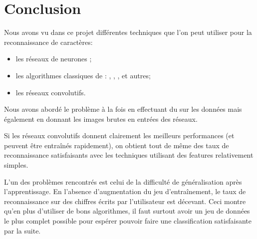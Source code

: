 
\chapter{Conclusion}

Nous avons vu dans ce projet différentes techniques que l'on peut utiliser 
pour la reconnaissance de caractères:
\begin{itemize}
  \item les réseaux de neurones ;
  \item les algorithmes classiques de  : , , , et autres;
  \item les réseaux convolutifs.
\end{itemize}

Nous avons abordé le problème à la fois en effectuant du  sur 
les données mais également en donnant les images brutes en entrées des réseaux. 

Si les réseaux convolutifs donnent clairement les meilleurs performances 
(et peuvent être entraînés rapidement), on obtient tout de même des taux 
de reconnaissance satisfaisants avec les techniques utilisant des features
relativement simples.

L'un des problèmes rencontrés est celui de la difficulté de généralisation 
après l'apprentissage.
En l'absence d'augmentation du jeu d'entraînement, le taux de reconnaissance 
sur des chiffres écrits par l'utilisateur est décevant.
Ceci montre qu'en plus d'utiliser de bons algorithmes, il faut surtout avoir 
un jeu de données le plus complet possible pour espérer pouvoir faire 
une classification satisfaisante par la suite.


